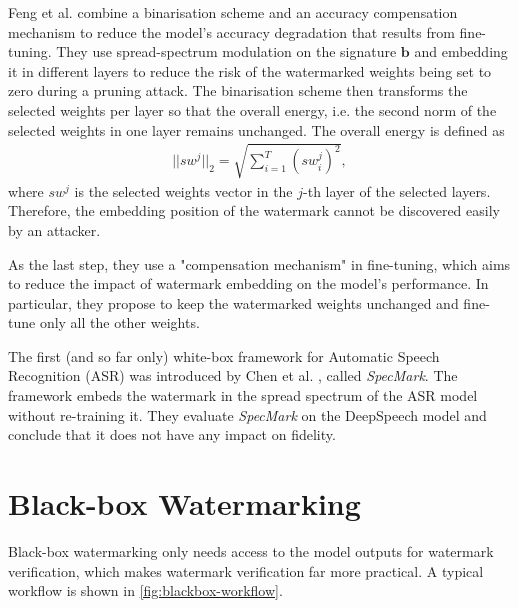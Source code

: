 Feng et al. \cite{li_watermarking_2020} combine a binarisation scheme and an accuracy compensation mechanism to reduce the model's accuracy degradation that results from fine-tuning. They use spread-spectrum modulation on the signature $\mathbf{b}$ and embedding it in different layers to reduce the risk of the watermarked weights being set to zero during a pruning attack.
The binarisation scheme then transforms the selected weights per layer so that the overall energy, i.e. the second norm of the selected weights in one layer remains unchanged. The overall energy is defined as
\begin{align}
||sw^j||_2= \sqrt{\sum_{i = 1}^T (sw_i^j)^2 },
\end{align}
where $sw^j$ is the selected weights vector in the $j$-th layer of the selected layers.
Therefore, the embedding position of the watermark cannot be discovered easily by an attacker.

As the last step, they use a "compensation mechanism" in fine-tuning, which aims to reduce the impact of watermark embedding on the model's performance. In particular, they propose to keep the watermarked weights unchanged and fine-tune only all the other weights.

The first (and so far only) white-box framework for Automatic Speech Recognition (ASR) was introduced by Chen et al. \cite{chen_specmark_2020}, called \textit{SpecMark}. The framework embeds the watermark in the spread spectrum of the ASR model without re-training it. They evaluate \textit{SpecMark} on the DeepSpeech model and conclude that it does not have any impact on fidelity.

\section{Black-box Watermarking}
\label{sec:blackbox}
Black-box watermarking only needs access to the model outputs for watermark verification, which makes watermark verification far more practical. A typical workflow %
is shown in \cref{fig:blackbox-workflow}.

